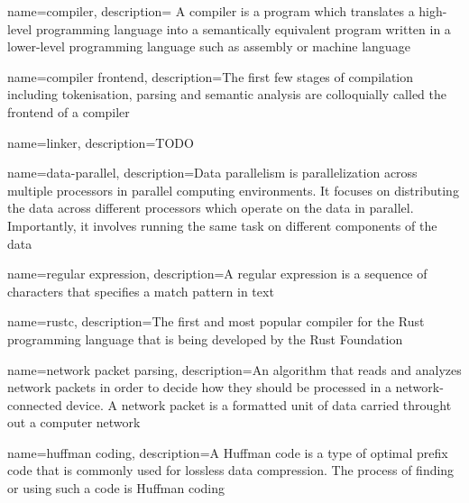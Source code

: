 
\makeglossaries

\renewcommand*{\glstextformat}[1]{\textcolor{black}{%
\ul{\mbox{#1}}}}

{
    name=compiler,
    description={
    A compiler is a program which translates a high-level
programming language into a semantically equivalent program written in a
lower-level programming language such as assembly or machine language}
}

{
    name=compiler frontend,
    description={The first few stages of compilation including tokenisation,
parsing and semantic analysis are colloquially called the frontend of a compiler}
}

{
    name=linker,
    description={TODO}
}

{
    name=data-parallel,
    description={Data parallelism is parallelization across multiple processors
in parallel computing environments. It focuses on distributing the data across
different processors which operate on the data in parallel. Importantly, it
involves running the same task on different components of the data}
}

{
    name=regular expression,
    description={A regular expression is a sequence of characters that specifies
a match pattern in text}
}

{
    name=rustc,
    description={The first and most popular compiler for the Rust programming
language that is being developed by the Rust Foundation}
}

 {
    name=network packet parsing,
    description={An algorithm that reads and analyzes network packets in order
to decide how they should be processed in a network-connected device. A network
packet is a formatted unit of data carried throught out a computer network}
}

{
    name=huffman coding,
    description={A Huffman code is a type of optimal prefix code that is
commonly used for lossless data compression. The process of finding or using
such a code is Huffman coding}
}





